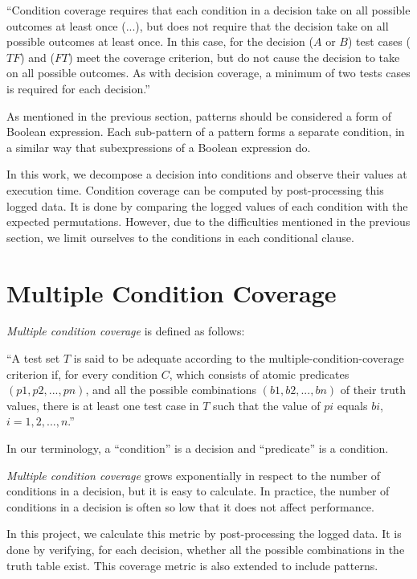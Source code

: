 \documentclass[12pt,a4paper]{report}
\begin{document}
``Condition coverage requires that each condition in a decision take on all possible outcomes at least once (...), but does not require that the decision take on all possible outcomes at least once. In this case, for the decision ($A$ or $B$) test cases ($TF$) and ($FT$) meet the coverage criterion, but do not cause the decision to take on all possible outcomes. As with decision coverage, a minimum of two tests cases is required for each decision.''\cite{KellyJ.:2001:PTM:886632}

As mentioned in the previous section, patterns should be considered a form of Boolean expression. Each sub-pattern of a pattern forms a separate condition, in a similar way that subexpressions of a Boolean expression do. 

In this work, we decompose a decision into conditions and observe their values at execution time. Condition coverage can be computed by post-processing this logged data. It is done by comparing the logged values of each condition with the expected permutations. However, due to the difficulties mentioned in the previous section, we limit ourselves to the conditions in each conditional clause. 

\section{Multiple Condition Coverage}
\emph{Multiple condition coverage} is defined as follows:

``A test set $T$ is said to be adequate according to the multiple-condition-coverage criterion if, for every condition $C$, which consists of atomic predicates $(p1, p2,  . . .  , pn)$, and all the possible combinations $(b1, b2,  . . .  , bn)$ of their truth values, there is at least one test case in $T$ such that the value of $pi$ equals $bi$, $i = 1, 2,  .  .  .  , n$.'' \cite{Zhu:1997:SUT:267580.267590}

In our terminology, a ``condition'' is a decision and ``predicate'' is a condition. 

\emph{Multiple condition coverage} grows exponentially in respect to the number of conditions in a decision, but it is easy to calculate. In practice, the number of conditions in a decision is often so low that it does not affect performance.

In this project, we calculate this metric by post-processing the logged data. It is done by verifying, for each decision, whether all the possible combinations in the truth table exist. This coverage metric is also extended to include patterns.
\end{document}
